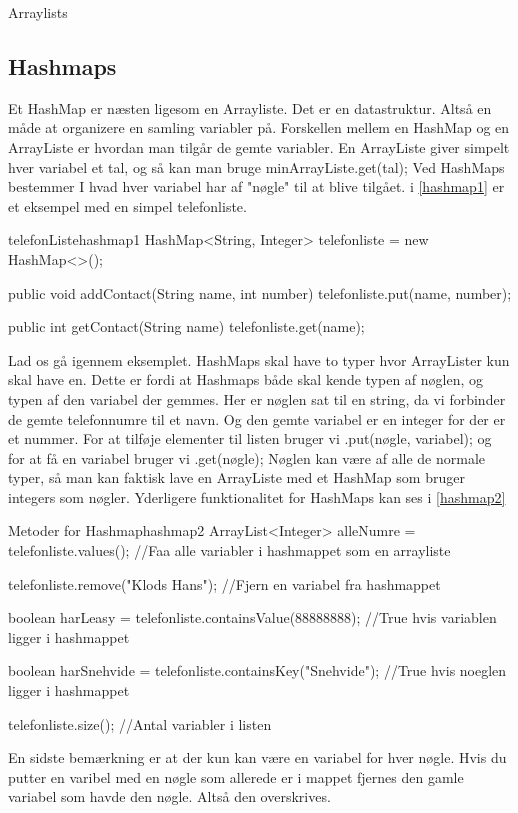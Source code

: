 Arraylists

\subsection{Hashmaps}
Et HashMap er næsten ligesom en Arrayliste. Det er en datastruktur. Altså en måde at organizere en samling variabler på. Forskellen mellem en HashMap og en ArrayListe er hvordan man tilgår de gemte variabler. En ArrayListe giver simpelt hver variabel et tal, og så kan man bruge minArrayListe.get(tal); Ved HashMaps bestemmer I hvad hver variabel har af "nøgle" til at blive tilgået. i \autoref{hashmap1} er et eksempel med en simpel telefonliste.
\begin{JavaCode}{telefonListe}{hashmap1}
	HashMap<String, Integer> telefonliste = new HashMap<>();
	
	public void addContact(String name, int number){
		telefonliste.put(name, number);
	}
	
	public int getContact(String name){
		telefonliste.get(name);	
	}
\end{JavaCode}
Lad os gå igennem eksemplet. HashMaps skal have to typer hvor ArrayLister kun skal have en. Dette er fordi at Hashmaps både skal kende typen af nøglen, og typen af den variabel der gemmes. Her er nøglen sat til en string, da vi forbinder de gemte telefonnumre til et navn. Og den gemte variabel er en integer for der er et nummer.  For at tilføje elementer til listen bruger vi .put(nøgle, variabel); og for at få en variabel bruger vi .get(nøgle); Nøglen kan være af alle de normale typer, så man kan faktisk lave en ArrayListe med et HashMap som bruger integers som nøgler. Yderligere funktionalitet for HashMaps kan ses i \autoref{hashmap2}
\begin{JavaCode}{Metoder for Hashmap}{hashmap2}
	ArrayList<Integer> alleNumre = telefonliste.values();
	//Faa alle variabler i hashmappet som en arrayliste
	
	telefonliste.remove("Klods Hans");
	//Fjern en variabel fra hashmappet
	
	boolean harLeasy = telefonliste.containsValue(88888888);
	//True hvis variablen ligger i hashmappet
	
	boolean harSnehvide = telefonliste.containsKey("Snehvide");
	//True hvis noeglen ligger i hashmappet
	
	telefonliste.size();
	//Antal variabler i listen
\end{JavaCode}
En sidste bemærkning er at der kun kan være en variabel for hver nøgle. Hvis du putter en varibel med en nøgle som allerede er i mappet fjernes den gamle variabel som havde den nøgle. Altså den overskrives.

